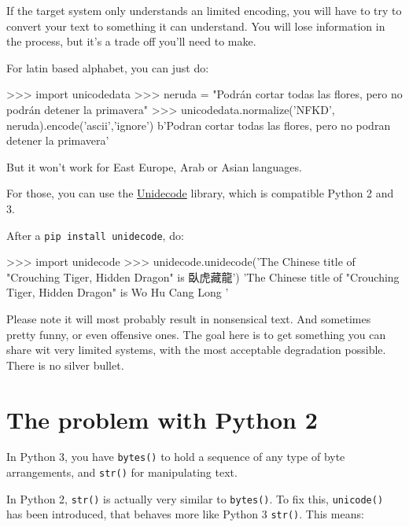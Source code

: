 If the target system only understands an limited encoding, you will have to try to convert your text to something it can understand. You will lose information in the process, but it's a trade off you'll need to make.

For latin based alphabet, you can just do:

\begin{py3}
>>> import unicodedata
>>> neruda = "Podrán cortar todas las flores, pero no podrán detener la primavera"
>>> unicodedata.normalize('NFKD', neruda).encode('ascii','ignore')
b'Podran cortar todas las flores, pero no podran detener la primavera'
\end{py3}

But it won't work for East Europe, Arab or Asian languages.

For those, you can use the \href{https://pypi.org/project/Unidecode/}{Unidecode} library, which is compatible Python 2 and 3.

After a \lstinline{pip install unidecode}, do:

\begin{py3}
>>> import unidecode
>>> unidecode.unidecode('The Chinese title of "Crouching Tiger, Hidden Dragon" is 臥虎藏龍')
'The Chinese title of "Crouching Tiger, Hidden Dragon" is Wo Hu Cang Long '
\end{py3}

Please note it will most probably result in nonsensical text. And sometimes pretty funny, or even offensive ones. The goal here is to get something you can share wit very limited systems, with the most acceptable degradation possible. There is no silver bullet.

\section{The problem with Python 2}

In Python 3, you have \lstinline{bytes()} to hold a sequence of any type of byte arrangements, and \lstinline{str()} for manipulating text.

In Python 2, \lstinline{str()} is actually very similar to \lstinline{bytes()}. To fix this, \lstinline{unicode()} has been introduced, that behaves more like Python 3 \lstinline{str()}. This means:

